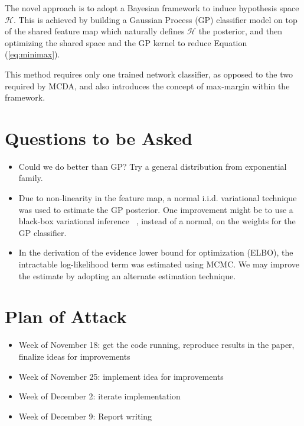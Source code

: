 The novel approach is to adopt a Bayesian framework to induce hypothesis space \(\mathcal{H}\). This is achieved by building a Gaussian Process (GP) classifier model on top of the shared feature map which naturally defines \(\mathcal{H}\) the posterior, and then optimizing the shared space and the GP kernel to reduce Equation (\ref{eq:minimax}). 

This method requires only one trained network classifier, as opposed to the two required by MCDA, and also introduces the concept of max-margin within the framework.  

\section*{Questions to be Asked}
\begin{itemize}
    \item Could we do better than GP? Try a general distribution from exponential family.
    \item Due to non-linearity in the feature map, a normal i.i.d. variational technique was used to estimate the GP posterior. One improvement might be to use a black-box variational inference
    ~\cite{ranganath2014black}, instead of a normal, on the weights for the GP classifier.
    \item In the derivation of the evidence lower bound for optimization (ELBO), the intractable log-likelihood term was estimated using MCMC. We may improve the estimate by adopting an alternate estimation technique.
\end{itemize}

\section*{Plan of Attack}
\begin{itemize}
    \item Week of November 18: get the code running, reproduce results in the paper, finalize ideas for improvements
    \item Week of November 25: implement idea for improvements
    \item Week of December 2: iterate implementation
    \item Week of December 9: Report writing
\end{itemize}





